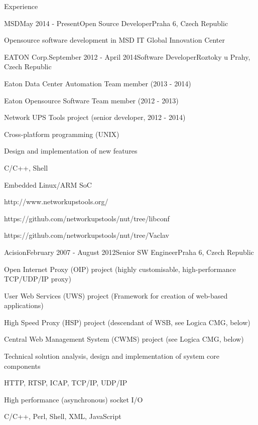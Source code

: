 \documentclass{resume} %
\begin{document}
\begin{rSection}{Experience}

\begin{rSubsection}{MSD}{May 2014 - Present}{Open Source Developer}{Praha 6, Czech Republic}
\item Opensource software development in MSD IT Global Innovation Center
\end{rSubsection}


\begin{rSubsection}{EATON Corp.}{September 2012 - April 2014}{Software Developer}{Roztoky u Prahy, Czech Republic}
\item Eaton Data Center Automation Team member (2013 - 2014)
\item Eaton Opensource Software Team member (2012 - 2013)
\item Network UPS Tools project (senior developer, 2012 - 2014)
\item Cross-platform programming (UNIX)
\item Design and implementation of new features
\item C/C++, Shell
\item Embedded Linux/ARM SoC
\item http://www.networkupstools.org/
\item https://github.com/networkupstools/nut/tree/libconf
\item https://github.com/networkupstools/nut/tree/Vaclav
\end{rSubsection}


\begin{rSubsection}{Acision}{February 2007 - August 2012}{Senior SW Engineer}{Praha 6, Czech Republic}
\item Open Internet Proxy (OIP) project (highly customisable, high-performance TCP/UDP/IP proxy)
\item User Web Services (UWS) project (Framework for creation of web-based applications)
\item High Speed Proxy (HSP) project (descendant of WSB, see Logica CMG, below)
\item Central Web Management System (CWMS) project (see Logica CMG, below)
\item Technical solution analysis, design and implementation of system core components
\item HTTP, RTSP, ICAP, TCP/IP, UDP/IP
\item High performance (asynchronous) socket I/O
\item C/C++, Perl, Shell, XML, JavaScript
\end{rSubsection}


\end{rSection}
\end{document}
